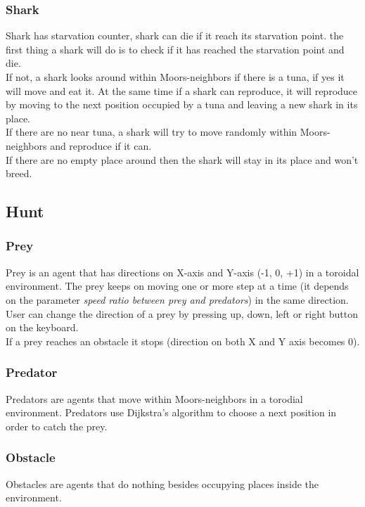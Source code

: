\subsubsection{Shark}
Shark has starvation counter, shark can die if it reach its starvation point. the first thing a shark will do is to check if it has reached the starvation point and die.\\
If not, a shark looks around within Moors-neighbors if there is a tuna, if yes it will move and eat it. At the same time if a shark can reproduce, it will reproduce by moving to the next position occupied by a tuna and leaving a new shark in its place.\\
If there are no near tuna, a shark will try to move randomly within Moors-neighbors and reproduce if it can.\\
If there are no empty place around then the shark will stay in its place and won't breed.

\subsection{Hunt}

\subsubsection{Prey}
Prey is an agent that has directions on X-axis and Y-axis (-1, 0, +1) in a toroidal environment. The prey keeps on moving one or more step at a time (it depends on the parameter \textit{speed ratio between prey and predators}) in the same direction. User can change the direction of a prey by pressing  up, down, left or right button on the keyboard.\\
If a prey reaches an obstacle it stops (direction on both X and Y axis becomes 0). 

\subsubsection{Predator}
Predators are agents that move within Moors-neighbors in a torodial environment. Predators use Dijkstra's algorithm to choose a next position in order to catch the prey.

\subsubsection{Obstacle}
Obstacles are agents that do nothing besides occupying places inside the environment.

